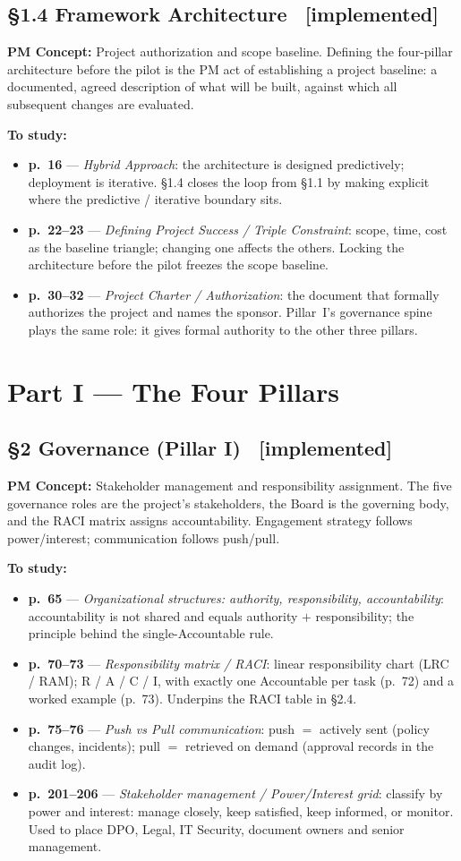 \documentclass[12pt,a4paper]{article}
\newcommand{\statusdone}{\textcolor{donegreen}{\small\textbf{[implemented]}}}
\newcommand{\slide}[3]{\item \textbf{p.~#1} --- \textit{#2}: #3}
\newcommand{\concetto}[1]{\textbf{PM Concept:} #1\par\vspace{2pt}}
\begin{document}
\subsection{\S1.4 Framework Architecture \ \statusdone}
\concetto{Project authorization and scope baseline. Defining the four-pillar architecture before the pilot is the PM act of establishing a project baseline: a documented, agreed description of what will be built, against which all subsequent changes are evaluated.}
\textbf{To study:}
\begin{itemize}
  \slide{16}{Hybrid Approach}{the architecture is designed predictively; deployment is iterative. \S1.4 closes the loop from \S1.1 by making explicit where the predictive / iterative boundary sits.}
  \slide{22--23}{Defining Project Success / Triple Constraint}{scope, time, cost as the baseline triangle; changing one affects the others. Locking the architecture before the pilot freezes the scope baseline.}
  \slide{30--32}{Project Charter / Authorization}{the document that formally authorizes the project and names the sponsor. Pillar~I's governance spine plays the same role: it gives formal authority to the other three pillars.}
\end{itemize}

\section{Part I --- The Four Pillars}

\subsection{\S2 Governance (Pillar I) \ \statusdone}
\concetto{Stakeholder management and responsibility assignment. The five governance roles are the project's stakeholders, the Board is the governing body, and the RACI matrix assigns accountability. Engagement strategy follows power/interest; communication follows push/pull.}
\textbf{To study:}
\begin{itemize}
  \slide{65}{Organizational structures: authority, responsibility, accountability}{accountability is not shared and equals authority $+$ responsibility; the principle behind the single-Accountable rule.}
  \slide{70--73}{Responsibility matrix / RACI}{linear responsibility chart (LRC / RAM); R / A / C / I, with exactly one Accountable per task (p.~72) and a worked example (p.~73). Underpins the RACI table in \S2.4.}
  \slide{75--76}{Push vs Pull communication}{push $=$ actively sent (policy changes, incidents); pull $=$ retrieved on demand (approval records in the audit log).}
  \slide{201--206}{Stakeholder management / Power/Interest grid}{classify by power and interest: manage closely, keep satisfied, keep informed, or monitor. Used to place DPO, Legal, IT Security, document owners and senior management.}
\end{itemize}
\end{document}
